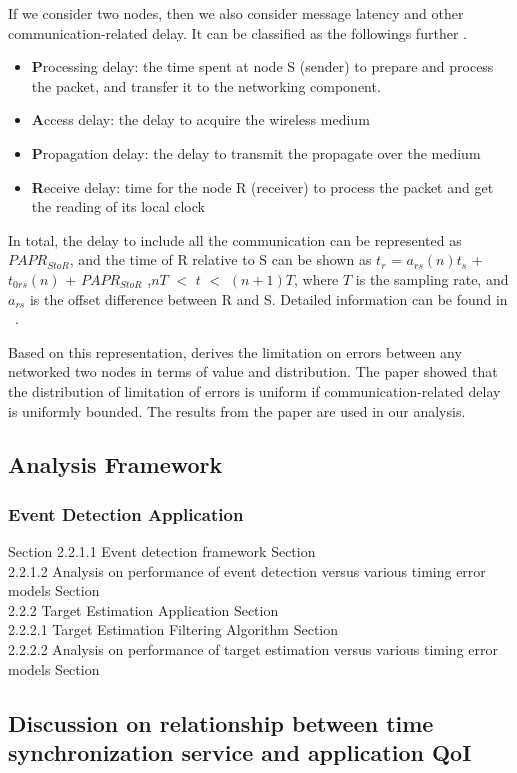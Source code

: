 If we consider two nodes, then we also consider message latency and
other communication-related delay. It can be classified as the
followings further \cite{timing-error}.
\begin{itemize}
\item {\bf P}rocessing delay: the time spent at node S (sender) to
prepare and process the packet, and transfer it to the networking
component.
\item {\bf A}ccess delay: the delay to acquire the wireless medium
\item {\bf P}ropagation delay: the delay to transmit the propagate over
the medium
\item {\bf R}eceive delay: time for the node R (receiver) to
process the packet and get the reading of its local clock
\end{itemize}

In total, the delay to include all the communication can be
represented as $PAPR_{StoR}$, and the time of R relative to S can be
shown as $t_r$ = $a_{rs}(n)t_s$ + $t_{0rs}(n)$ + $PAPR_{StoR}$ ,$nT$
$<$ $t$ $<$ $(n+1)T$, where $T$ is the sampling rate, and $a_{rs}$
is the offset difference between R and S. Detailed information can
be found in ~\cite{timing-error}.

Based on this representation, \cite{timing-error} derives the
limitation on errors between any networked two nodes in terms of
value and distribution. The paper showed that the distribution of
limitation of errors is uniform if communication-related delay is
uniformly bounded. The results from the paper are used in our
analysis.

\subsection{Analysis Framework}
\subsubsection{Event Detection Application}
Section 2.2.1.1 Event detection framework Section \\
2.2.1.2 Analysis on performance of event detection versus various
timing error models Section \\
2.2.2 Target Estimation Application Section \\
2.2.2.1 Target Estimation Filtering Algorithm Section \\
2.2.2.2 Analysis on performance of target estimation versus various
timing error models Section

\subsection{Discussion on relationship between time synchronization service and application
QoI}
